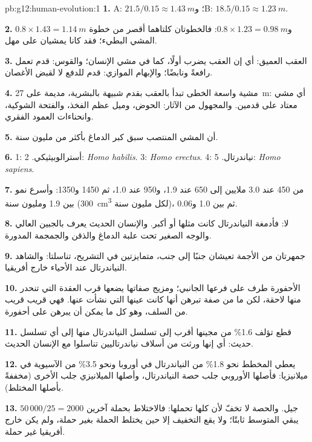 \begin{solution}{pb:g12:human-evolution:1}
\textbf{1.} A: $21.5/0.15 \approx \qty{1.43}{m}$؛ وB: $18.5/0.15
\approx \qty{1.23}{m}$.

\textbf{2.} $0.8 \times 1.43 = \qty{1.14}{m}$ و$0.8 \times 1.23 =
\qty{0.98}{m}$: فالخطوتان كلتاهما أقصر من خطوة المشي البطيء؛ فقد كانا
يمشيان على مهل.

\textbf{3.} العقب العميق: أي إن العقب يضرب أولًا، كما في مشي الإنسان؛
والقوس: قدم تعمل رافعةً ونابضًا؛ والإبهام الموازي: قدم للدفع لا لقبض
الأغصان.

\textbf{4.} مشية واسعة الخطى تبدأ بالعقب بقدم شبيهة بالبشرية، مديمة
على \qty{27}{m}: أي مشي معتاد على قدمين. والمجهول من الآثار: الحوض،
وميل عظم الفخذ، والفتحة الشوكية، وانحناءات العمود الفقري.

\textbf{5.} أن المشي المنتصب سبق كبر الدماغ بأكثر من مليون سنة.

\textbf{6.} 1: أسترالوبيثيكي. 2: \emph{Homo habilis}. 3:
\emph{Homo erectus}. 4: نياندرتال. 5: \emph{Homo sapiens}.

\textbf{7.} من 450 عند 3.0 ملايين إلى 650 عند 1.9، و950 عند 1.0، ثم
1450 و1350: وأسرع نمو بين 1.9 ومليون سنة (\qty{300}{cm^3} لكل مليون
سنة)، ثم بين 1.0 و0.06.

\textbf{8.} لا: فأدمغة النياندرتال كانت مثلها أو أكبر. والإنسان
الحديث يعرف بالجبين العالي والوجه الصغير تحت علبة الدماغ والذقن
والجمجمة المدورة.

\textbf{9.} جمهرتان من الأجمة تعيشان جنبًا إلى جنب، متمايزتين في
التشريح، تناسلتا: والشاهد  النياندرتال عند الأحياء خارج أفريقيا.

\textbf{10.} الأحفورة طرف على فرعها الجانبي؛ ومزيج صفاتها يضعها قرب
العقدة التي تنحدر منها  لاحقة، لكن ما من صفة تبرهن أنها كانت
 عينها التي نشأت عنها. فهي قريب قريب من السلف، وهو كل ما يمكن
أن يبرهن على أحفورة.

\textbf{11.} قطع تؤلف 1.6\% من مجينها أقرب إلى تسلسل النياندرتال منها
إلى أي تسلسل حديث: أي إنها ورثت من أسلاف نياندرتاليين تناسلوا مع
الإنسان الحديث.

\textbf{12.} يعطي المخطط نحو 1.8\% من النياندرتال في أوروبا ونحو
3.5\% من   الآسيوية في ميلانيزيا: فأصلها الأوروبي جلب حصة
النياندرتال، وأصلها الميلانيزي جلب الأخرى (مخففةً بأصلها المختلط).

\textbf{13.} $50\,000/25 = 2000$ جيل. والحصة لا تخفّ لأن  كلها
تحملها: فالاختلاط بحملة آخرين يبقي المتوسط ثابتًا؛ ولا يقع التخفيف إلا
حين يختلط الحملة بغير حملة، ولم يكن خارج أفريقيا غير حملة.


\end{solution}
